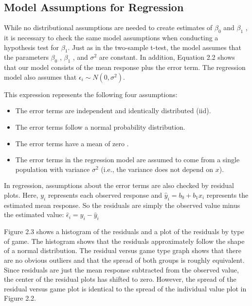 \documentclass[
]{report}
\begin{document}
\hypertarget{model-assumptions-for-regression}{%
\subsection*{Model Assumptions for Regression}\label{model-assumptions-for-regression}}

While no distributional assumptions are needed to create estimates of \(\scriptstyle \beta_0\) and \(\scriptstyle \beta_1\) , it is necessary to check the same model assumptions when conducting a hypothesis test for \(\scriptstyle \beta_1\). Just as in the two-sample t-test, the model assumes that the parameters \(\scriptstyle \beta_0\) , \(\scriptstyle \beta_1\) , and \(\scriptstyle \sigma^2\) are constant. In addition, Equation 2.2 shows that our model consists of the mean response plus the error term. The regression model also assumes that \(\scriptstyle \epsilon_i \sim N(0,\sigma^2)\).

This expression represents the following four assumptions:
\vspace{-1em}

\begin{itemize}
\item The error terms are independent and identically distributed (iid).
\item The error terms follow a normal probability distribution.
\item The error terms have a mean of zero .
\item The error terms in the regression model are assumed to come from a single population with variance $\scriptstyle \sigma^2$ (i.e., the variance does not depend on $\scriptstyle x$).
\end{itemize}

In regression, assumptions about the error terms are also checked by residual plots. Here, \(\scriptstyle y_i\) represents each observed response and \(\scriptstyle \hat{y}_i = b_0 + b_1x_i\) represents the estimated mean response. So the residuals are simply the observed value minus the estimated value: \(\scriptstyle \hat{\epsilon}_i = y_i - \hat{y}_i\)

Figure 2.3 shows a histogram of the residuals and a plot of the residuals by type of game. The histogram shows that the residuals approximately follow the shape of a normal distribution. The residual versus game type graph shows that there are no obvious outliers and that the spread of both groups is roughly equivalent. Since residuals are just the mean response subtracted from the observed value, the center of the residual plots has shifted to zero. However, the spread of the residual versus game plot is identical to the spread of the individual value plot in Figure 2.2.
\end{document}
